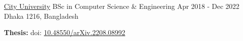 

\begin{cventries}

  \cventry
    {\href{https://www.cityuniversity.edu.bd/}{City University}} %
    {BSc in Computer Science \& Engineering} %
    {Apr 2018 - Dec 2022} %
    {Dhaka 1216, Bangladesh} %
  {
    \begin{cvitems}
      \item \textbf{Thesis:}  doi: \href{https://doi.org/10.48550/arXiv.2208.08992}{\textcolor{Cerulean}{10.48550/arXiv.2208.08992}}
    \end{cvitems}
  }


    
 
\end{cventries}
